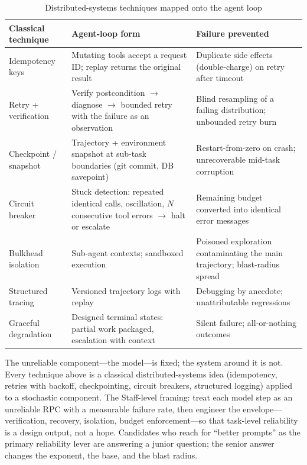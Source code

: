 \begin{table}[H]
\centering
\caption{Distributed-systems techniques mapped onto the agent loop}
\label{tab:ds_mapping}
\begin{tabularx}{\textwidth}{p{3.3cm}XX}
\toprule
\textbf{Classical technique} & \textbf{Agent-loop form} & \textbf{Failure prevented} \\
\midrule
Idempotency keys & Mutating tools accept a request ID; replay returns the original result & Duplicate side effects (double-charge) on retry after timeout \\
Retry + verification & Verify postcondition $\rightarrow$ diagnose $\rightarrow$ bounded retry with the failure as an observation & Blind resampling of a failing distribution; unbounded retry burn \\
Checkpoint / snapshot & Trajectory + environment snapshot at sub-task boundaries (git commit, DB savepoint) & Restart-from-zero on crash; unrecoverable mid-task corruption \\
Circuit breaker & Stuck detection: repeated identical calls, oscillation, $N$ consecutive tool errors $\rightarrow$ halt or escalate & Remaining budget converted into identical error messages \\
Bulkhead isolation & Sub-agent contexts; sandboxed execution & Poisoned exploration contaminating the main trajectory; blast-radius spread \\
Structured tracing & Versioned trajectory logs with replay & Debugging by anecdote; unattributable regressions \\
Graceful degradation & Designed terminal states: partial work packaged, escalation with context & Silent failure; all-or-nothing outcomes \\
\bottomrule
\end{tabularx}
\end{table}

\begin{keyinsight}
The unreliable component---the model---is fixed; the system around it is not. Every technique above is a classical distributed-systems idea (idempotency, retries with backoff, checkpointing, circuit breakers, structured logging) applied to a stochastic component. The Staff-level framing: treat each model step as an unreliable RPC with a measurable failure rate, then engineer the envelope---verification, recovery, isolation, budget enforcement---so that task-level reliability is a design output, not a hope. Candidates who reach for ``better prompts'' as the primary reliability lever are answering a junior question; the senior answer changes the exponent, the base, and the blast radius.
\end{keyinsight}

